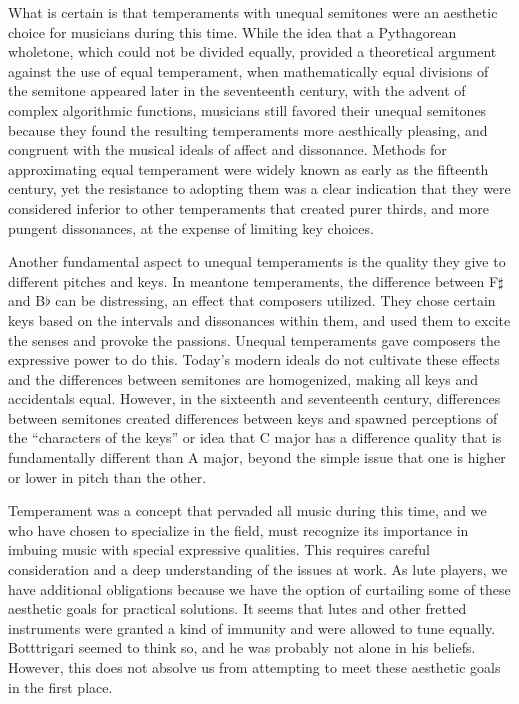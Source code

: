 What is certain is that temperaments with unequal semitones were an aesthetic choice for musicians
during this time.  While the idea that a Pythagorean wholetone, which could not be divided equally,
provided a theoretical argument against the use of equal temperament, when mathematically equal
divisions of the semitone appeared later in the seventeenth century, with the advent of complex
algorithmic functions, musicians still favored their unequal semitones because they found the
resulting temperaments more aesthically pleasing, and congruent with the musical ideals of
affect and dissonance. Methods for approximating
equal temperament were widely known as early as the fifteenth century, yet the resistance to
adopting them was a clear indication that they were considered inferior to other temperaments that
created purer thirds, and more pungent dissonances, at the expense of limiting key choices.

Another fundamental aspect to unequal temperaments is the quality they give to different pitches and
keys.  In meantone temperaments, the difference between F$\sharp$ and B$\flat$ can be distressing,
an effect that composers utilized.  They chose certain keys based on the intervals and dissonances
within them, and used them to excite the  senses and provoke the passions. Unequal temperaments
gave composers the expressive power to do this. Today's modern ideals do not cultivate these
effects and the differences between semitones are homogenized, making all keys and accidentals
equal.  However, in the sixteenth and seventeenth century, differences between semitones created
differences between keys and spawned perceptions of the ``characters of the keys'' or idea that C
major has a difference quality that is fundamentally different than A major, beyond the simple issue
that one is higher or lower in pitch than the other.

Temperament was a concept that pervaded all music during this time, and we who have chosen to 
specialize in the field, must recognize its importance in imbuing music with special expressive
qualities.  This requires careful consideration and a deep understanding of the issues at work.  As lute
players, we have additional obligations because we have the option of curtailing some of these
aesthetic goals for practical solutions.  It seems that lutes and other fretted instruments were
granted a kind of immunity and were allowed to tune equally.  Botttrigari seemed to think so, and he
was probably not alone in his beliefs. \autocite[19]{HB:1}  However, this does not absolve us from
attempting to meet these aesthetic goals in the first place.

